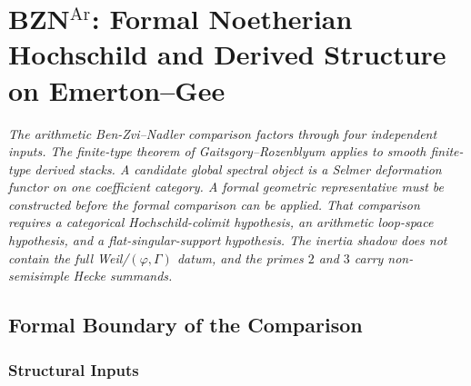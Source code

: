 \chapter{BZN\(^{\mathrm{Ar}}\): Formal Noetherian
Hochschild and Derived Structure on Emerton--Gee}
\label{v4-arith:bzn-sub}

\emph{The arithmetic Ben-Zvi--Nadler comparison factors through four
independent inputs. The finite-type theorem of Gaitsgory--Rozenblyum
applies to smooth finite-type derived stacks. A candidate global
spectral object is a Selmer deformation functor on one coefficient
category. A formal geometric representative must be constructed before
the formal comparison can be applied. That comparison requires a categorical Hochschild-colimit hypothesis,
an arithmetic loop-space hypothesis, and a flat-singular-support
hypothesis. The inertia shadow does not contain the full
Weil/\((\varphi,\Gamma)\) datum, and the primes \(2\) and \(3\) carry
non-semisimple Hecke summands.}

\section{Formal Boundary of the Comparison}
\label{v4-arith:bzn-sub:context}

\subsection{Structural Inputs}

